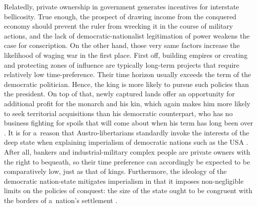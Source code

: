 Relatedly, private ownership in government generates incentives for interstate bellicosity. True enough, the prospect of drawing income from the conquered economy should prevent the ruler from wrecking it in the course of military actions, and the lack of democratic-nationalist legitimation of power weakens the case for conscription. On the other hand, those very same factors increase the likelihood of waging war in the first place. First off, building empires or creating and protecting zones of influence are typically long-term projects that require relatively low time-preference. Their time horizon usually exceeds the term of the democratic politician. Hence, the king is more likely to pursue such policies than the president. On top of that, newly captured lands offer an opportunity for additional profit for the monarch and his kin, which again makes him more likely to seek territorial acquisitions than his democratic counterpart, who has no business fighting for spoils that will come about when his term has long been over 
\parencite[][p.121]{mises_liberalism_1985}. %
 It is for a~reason that Austro-libertarians standardly invoke the interests of the deep state when explaining imperialism of democratic nations such as the USA 
\parencites[][]{rothbard_wall_2011}[][pp.77–116]{hoppe_economics_2006}. %
 After all, bankers and industrial-military complex people are private owners with the right to bequeath, so their time preference can accordingly be expected to be comparatively low, just as that of kings. Furthermore, the ideology of the democratic nation-state mitigates imperialism in that it imposes non-negligible limits on the policies of conquest: the size of the state ought to be congruent with the borders of a~nation's settlement 
\parencites[][p.1]{gellner_nations_1993}[][p.118]{mises_liberalism_1985}. %
